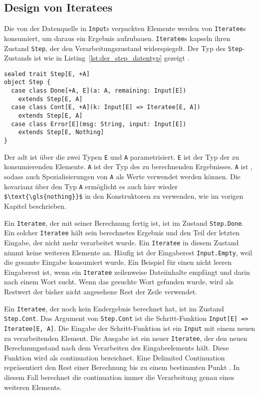 

\subsection{Design von Iteratees} %
\label{sub:design_iteratees}

Die von der Datenquelle in \lstinline|Input|s verpackten Elemente werden von \lstinline|Iteratee|s konsumiert, um daraus ein Ergebnis aufzubauen.
\lstinline|Iteratee|s kapseln ihren Zustand \lstinline|Step|, der den Verarbeitungszustand widerspiegelt.
Der Typ des \lstinline|Step|-Zustands ist wie in Listing~\ref{lst:der_step_datentyp} gezeigt \cite[vgl.][Z.~256]{play_iteratee_source_code}.
\begin{lstlisting}[caption=Der Step-Datentyp, label=lst:der_step_datentyp]
sealed trait Step[E, +A]
object Step {
  case class Done[+A, E](a: A, remaining: Input[E])
    extends Step[E, A]
  case class Cont[E, +A](k: Input[E] => Iteratee[E, A])
    extends Step[E, A]
  case class Error[E](msg: String, input: Input[E])
    extends Step[E, Nothing]
}
\end{lstlisting}

Der \gls{adt} ist über die zwei Typen \lstinline|E| und \lstinline|A| parametrisiert.
\lstinline|E| ist der Typ der zu konsumierenden Elemente.
\lstinline|A| ist der Typ des zu berechnenden Ergebnisses.
\lstinline|A| ist , sodass auch Spezialisierungen von \lstinline|A| als Werte verwendet werden können.
Die \gls{kovarianz} über den Typ \lstinline|A| ermöglicht es auch hier wieder \lstinline[mathescape]|$\text{\gls{nothing}}$| in den Konstruktoren zu verwenden, wie im vorigen Kapitel beschrieben.

Ein \lstinline|Iteratee|, der mit seiner Berechnung fertig ist, ist im Zustand \lstinline|Step.Done|.
Ein solcher \lstinline|Iteratee| hält sein berechnetes Ergebnis und den Teil der letzten Eingabe, der nicht mehr verarbeitet wurde.
Ein \lstinline|Iteratee| in diesem Zustand nimmt keine weiteren Elemente an.
Häufig ist der Eingaberest \lstinline|Input.Empty|, weil die gesamte Eingabe konsumiert wurde.
Ein Beispiel für einen nicht leeren Eingaberest ist, wenn ein \lstinline|Iteratee| zeilenweise Dateiinhalte empfängt und darin nach einem Wort sucht.
Wenn das gesuchte Wort gefunden wurde, wird als Restwert der bisher nicht angesehene Rest der Zeile verwendet.

Ein \lstinline|Iteratee|, der noch kein Endergebnis berechnet hat, ist im Zustand \lstinline|Step.Cont|.
Das Argument von \lstinline|Step.Cont| ist die Schritt-Funktion \lstinline[breaklines=true]|Input[E] => Iteratee[E, A]|.
Die Eingabe der Schritt-Funktion ist ein \lstinline|Input| mit einem neuen zu verarbeitenden Element.
Die Ausgabe ist ein neuer \lstinline|Iteratee|, der den neuen Berechnungsstand nach dem Verarbeiten des Eingabeelements hält.
Diese Funktion wird als \gls{continuation} bezeichnet.
Eine Delimited Continuation repräsentiert den Rest einer Berechnung bis zu einem bestimmten Punkt \cite[vgl.][S.~1]{continuations}.
In diesem Fall berechnet die \gls{continuation} immer die Verarbeitung genau eines weiteren Elements.

